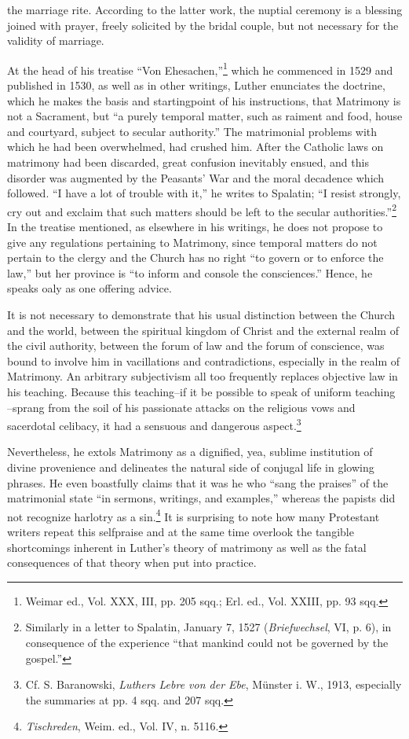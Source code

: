 the marriage rite. According to the latter work, the nuptial ceremony
is a blessing joined with prayer, freely solicited by the bridal couple,
but not necessary for the validity of marriage.

At the head of his treatise “Von Ehesachen,”\footnote{Weimar ed., Vol. XXX, III, pp. 205 sqq.; Erl. ed., Vol. XXIII, pp. 93 sqq.}
 which he commenced
in 1529 and published in 1530, as well as in other writings,
Luther enunciates the doctrine, which he makes the basis and startingpoint
of his instructions, that Matrimony is not a Sacrament, but
“a purely temporal matter, such as raiment and food, house and courtyard,
subject to secular authority.” The matrimonial problems with
which he had been overwhelmed, had crushed him. After the Catholic
laws on matrimony had been discarded, great confusion inevitably
ensued, and this disorder was augmented by the Peasants’ War and the
moral decadence which followed. “I have a lot of trouble with it,”
he writes to Spalatin; “I resist strongly, cry out and exclaim that such
matters should be left to the secular authorities.”\footnote{Similarly in a letter to Spalatin, January 7, 1527 (\textit{Briefwechsel}, VI, p. 6), in consequence
of the experience “that mankind could not be governed by the gospel.”}
In the treatise
mentioned, as elsewhere in his writings, he does not propose to give
any regulations pertaining to Matrimony, since temporal matters do
not pertain to the clergy and the Church has no right “to govern or to
enforce the law,” but her province is “to inform and console the
consciences.” Hence, he speaks oaly as one offering advice.

It is not necessary to demonstrate that his usual distinction between
the Church and the world, between the spiritual kingdom of Christ
and the external realm of the civil authority, between the forum of law
and the forum of conscience, was bound to involve him in vacillations
and contradictions, especially in the realm of Matrimony. An arbitrary
subjectivism all too frequently replaces objective law in his teaching.
Because this teaching--if it be possible to speak of uniform teaching
--sprang from the soil of his passionate attacks on the religious vows
and sacerdotal celibacy, it had a sensuous and dangerous aspect.\footnote
{Cf. S. Baranowski, \textit{Luthers Lebre von der Ebe}, Münster i. W., 1913, especially the
summaries at pp. 4 sqq. and 207 sqq.}

Nevertheless, he extols Matrimony as a dignified, yea, sublime institution
of divine provenience and delineates the natural side of conjugal
life in glowing phrases. He even boastfully claims that it was he who
“sang the praises” of the matrimonial state “in sermons, writings, and
examples,” whereas the papists did not recognize harlotry as a sin.\footnote
{\textit{Tischreden}, Weim. ed., Vol. IV, n. 5116.}
It is surprising to note how many Protestant writers repeat this selfpraise
and at the same time overlook the tangible shortcomings inherent
in Luther’s theory of matrimony as well as the fatal consequences
of that theory when put into practice.

